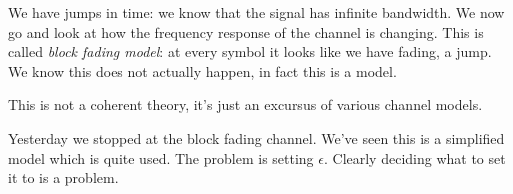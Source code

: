 \documentclass[a4paper, 12pt]{book}
\begin{document}
We have jumps in time: we know that the signal has infinite bandwidth.
We now go and look at how the frequency response of the channel is changing.
This is called \textit{block fading model}: at every symbol it looks like we have fading, a jump.
We know this does not actually happen, in fact this is a model.
\begin{greenbar}
This is not a coherent theory, it's just an excursus of various channel models.
\end{greenbar}

Yesterday we stopped at the block fading channel. We've seen this is a simplified model which is quite used. The problem is setting $\epsilon$.
Clearly deciding what to set it to is a problem.
\end{document}
